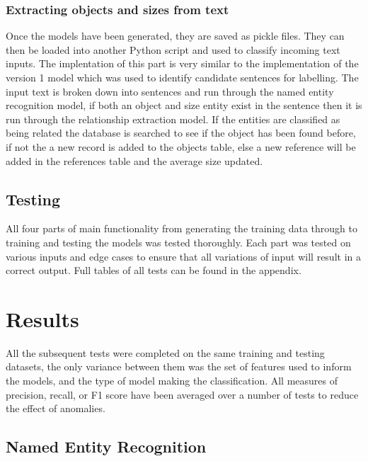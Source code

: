 \documentclass[11pt,oneside]{book}
\begin{document}
\subsection{Extracting objects and sizes from text}
Once the models have been generated, they are saved as pickle files. They can then be loaded into another Python script and used to classify incoming text inputs. The implentation of this part is very similar to the implementation of the version 1 model which was used to identify candidate sentences for labelling. The input text is broken down into sentences and run through the named entity recognition model, if both an object and size entity exist in the sentence then it is run through the relationship extraction model. If the entities are classified as being related the database is searched to see if the object has been found before, if not the a new record is added to the objects table, else a new reference will be added in the references table and the average size updated.


\section{Testing}

All four parts of main functionality from generating the training data through to training and testing the models was tested thoroughly. Each part was tested on various inputs and edge cases to ensure that all variations of input will result in a correct output. Full tables of all tests can be found in the appendix.

\chapter{Results}

All the subsequent tests were completed on the same training and testing datasets, the only variance between them was the set of features used to inform the models, and the type of model making the classification. All measures of precision, recall, or F1 score have been averaged over a number of tests to reduce the effect of anomalies.

\section{Named Entity Recognition}
\end{document}
